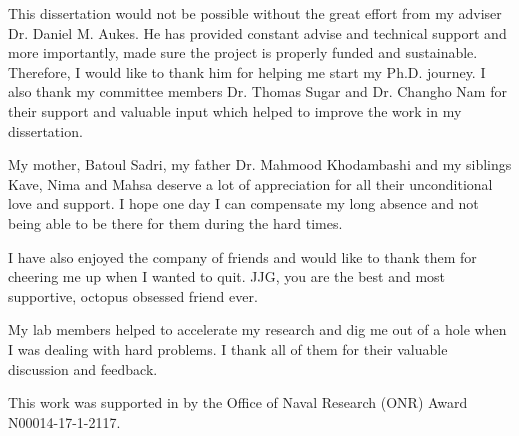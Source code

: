 
\begin{acknowledgements}      

This dissertation would not be possible without the great effort from my adviser Dr. Daniel M. Aukes. He has provided constant advise and technical support and more importantly, made sure the project is properly funded and sustainable. Therefore, I would like to thank him for helping me start my Ph.D. journey. I also thank my committee members Dr. Thomas Sugar and Dr. Changho Nam for their support and valuable input which helped to improve the work in my dissertation.

My mother, Batoul Sadri, my father Dr. Mahmood Khodambashi and my siblings Kave, Nima and Mahsa deserve a lot of appreciation for all their unconditional love and support. I hope one day I can compensate my long absence and not being able to be there for them during the hard times.  

I have also enjoyed the company of friends and would like to thank them for cheering me up when I wanted to quit. JJG, you are the best and most supportive, octopus obsessed friend ever.

My lab members helped to accelerate my research and dig me out of a hole when I was dealing with hard problems. I thank all of them for their valuable discussion and feedback.

This work was supported in by the Office of Naval Research (ONR) Award N00014-17-1-2117.

\end{acknowledgements}